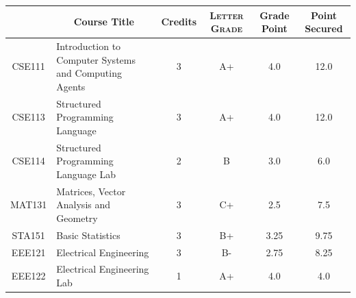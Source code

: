 \documentclass[11pt]{article}
\newcommand*{\numtwo}[1]{\pgfmathprintnumber[
                    fixed, precision=2, fixed zerofill=true]{#1}}
\begin{document}
                \begin{center}
                    \renewcommand{\arraystretch}{1.08}
                    
                \begin{tabular}{|c|l|c|>{\scshape}c|c|c|}
                \hline  \rule[-1ex]{0pt}{3.5ex} {\centering{\bf Course Code}} &  \multicolumn{1}{c|}{\textbf{Course Title}}  & {\bf Credits} & {\bf Letter Grade} & {\bf Grade Point} & {\bf Point Secured}  \\ 
                \hline   CSE111 &  Introduction to Computer Systems and Computing Agents		 & 3 & A+ & 4.0 & 12.0 \\ %
                \hline   CSE113 &  Structured Programming Language		 & 3 & A+ & 4.0 & 12.0 \\ %
                \hline   CSE114 &  Structured Programming Language Lab		 & 2 & B & 3.0 & 6.0 \\ %
                \hline   MAT131 &  Matrices, Vector Analysis and Geometry		 & 3 & C+ & 2.5 & 7.5 \\ %
                \hline   STA151 &  Basic Statistics		 & 3 & B+ & 3.25 & 9.75 \\ %
                \hline   EEE121 &  Electrical Engineering		 & 3 & B- & 2.75 & 8.25 \\ %
                \hline   EEE122 &  Electrical Engineering Lab		 & 1 & A+ & 4.0 & 4.0 \\ %

\hline                %
                \end{tabular}
                \end{center}
                \renewcommand{\arraystretch}{1.03}
\end{document}
